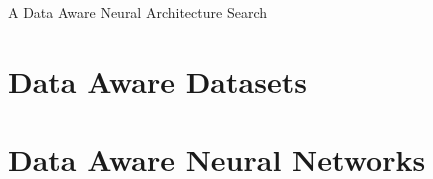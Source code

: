 \documentclass{acaces}
\begin{document}
A Data Aware Neural Architecture Search 



\section{Data Aware Datasets}

\section{Data Aware Neural Networks}


\end{document}
